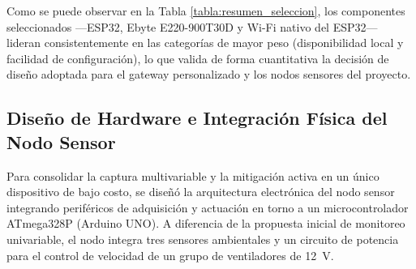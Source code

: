 \FloatBarrier
Como se puede observar en la Tabla \ref{tabla:resumen_seleccion}, los componentes seleccionados ---ESP32, Ebyte E220-900T30D y Wi-Fi nativo del ESP32--- lideran consistentemente en las categorías de mayor peso (disponibilidad local y facilidad de configuración), lo que valida de forma cuantitativa la decisión de diseño adoptada para el gateway personalizado y los nodos sensores del proyecto.

\subsection{Diseño de Hardware e Integración Física del Nodo Sensor}

Para consolidar la captura multivariable y la mitigación activa en un único dispositivo de bajo costo, se diseñó la arquitectura electrónica del nodo sensor integrando periféricos de adquisición y actuación en torno a un microcontrolador ATmega328P (Arduino UNO). A diferencia de la propuesta inicial de monitoreo univariable, el nodo integra tres sensores ambientales y un circuito de potencia para el control de velocidad de un grupo de ventiladores de 12~V.

